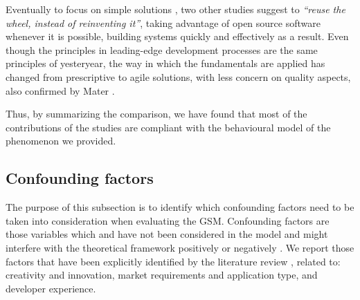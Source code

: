 \documentclass[10pt,journal,letterpaper,compsoc]{IEEEtran}
\begin{document}
Eventually to focus on simple solutions%
, two other studies \cite{Wall2001, Bean2005} suggest to \textit{``reuse the wheel, instead of reinventing it''}, taking advantage of open source software whenever it is possible, building systems quickly and effectively as a result. Even though the principles in leading-edge development processes are the same principles of yesteryear, the way in which the fundamentals are applied has changed from prescriptive to agile solutions, with less concern on quality aspects, also confirmed by Mater \cite{Mater2000}.

Thus, by summarizing the comparison, we have found that most of the contributions of the studies are compliant with the behavioural model of the phenomenon we provided.

\subsection{Confounding factors}
\label{sect:an:comp:cat-vs-literature:conf}

The purpose of this subsection is to identify which confounding factors need to be taken into consideration when evaluating the GSM. Confounding factors are those variables which and have not been considered in the model and might interfere with the theoretical framework positively or negatively \cite{ColinRobson2009}. We report those factors that have been explicitly identified by the literature review%
, related to: creativity and innovation, market requirements and application type, and developer experience.

\end{document}
